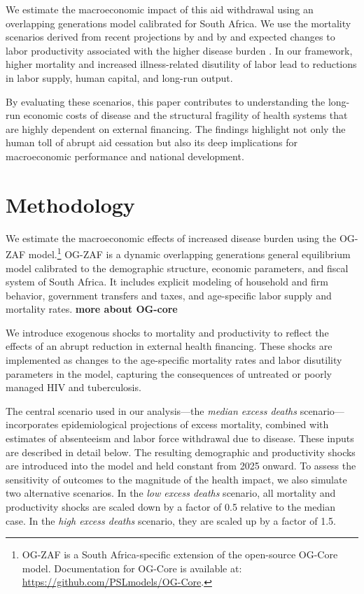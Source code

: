 \documentclass[letterpaper,12pt]{article}
\theoremstyle{definition}
\begin{document}
\begin{spacing}{1.5}
We estimate the macroeconomic impact of this aid withdrawal using an overlapping generations model calibrated for South Africa. We use the mortality scenarios derived from recent projections by \citet{KS2025} and by \citet{Gandhi2025} and expected changes to labor productivity associated with the higher disease burden \citep{Keogh2024,Panda2024}. In our framework, higher mortality and increased illness-related disutility of labor lead to reductions in labor supply, human capital, and long-run output. 

By evaluating these scenarios, this paper contributes to understanding the long-run economic costs of disease and the structural fragility of health systems that are highly dependent on external financing. The findings highlight not only the human toll of abrupt aid cessation but also its deep implications for macroeconomic performance and national development.




\section{Methodology}\label{SecMethod}


We estimate the macroeconomic effects of increased disease burden using the OG-ZAF model.\footnote{OG-ZAF is a South Africa-specific extension of the open-source OG-Core model. Documentation for OG-Core is available at: \url{https://github.com/PSLmodels/OG-Core}.} OG-ZAF is a dynamic overlapping generations general equilibrium model calibrated to the demographic structure, economic parameters, and fiscal system of South Africa. It includes explicit modeling of household and firm behavior, government transfers and taxes, and age-specific labor supply and mortality rates.  \textbf{more about  OG-core}

We introduce exogenous shocks to mortality and productivity to reflect the effects of an abrupt reduction in external health financing. These shocks are implemented as changes to the age-specific mortality rates and labor disutility parameters in the model, capturing the consequences of untreated or poorly managed HIV and tuberculosis.

The central scenario used in our analysis—the \textit{median excess deaths} scenario—incorporates epidemiological projections of excess mortality, combined with estimates of absenteeism and labor force withdrawal due to disease. These inputs are described in detail below. The resulting demographic and productivity shocks are introduced into the model and held constant from 2025 onward. To assess the sensitivity of outcomes to the magnitude of the health impact, we also simulate two alternative scenarios. In the \textit{low excess deaths} scenario, all mortality and productivity shocks are scaled down by a factor of 0.5 relative to the median case. In the \textit{high excess deaths} scenario, they are scaled up by a factor of 1.5. 



\end{spacing}
\end{document}
